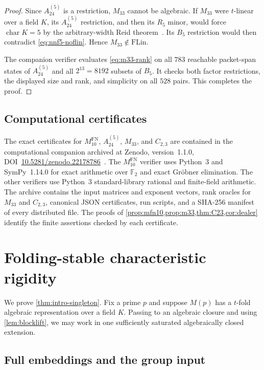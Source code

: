 \documentclass[11pt]{article}
\theoremstyle{definition}
\newcommand{\FLin}{\mathrm{FLin}}
\begin{document}
\begin{proof}
Since $A_{24}^{(5)}$ is a restriction, $M_{33}$ cannot be algebraic.  If $M_{33}$ were $t$-linear over a field $K$, its $A_{24}^{(5)}$ restriction, and then its $R_5$ minor, would force $\operatorname{char}K=5$ by the arbitrary-width Reid theorem~\cite[Theorem~3.1]{BenEfraim2016}.  Its $B_5$ restriction would then contradict \eqref{eq:nnf5-noflin}.  Hence $M_{33}\notin\FLin$.

The companion verifier evaluates \eqref{eq:m33-rank} on all $783$ reachable packet-span states of $A_{24}^{(5)}$ and all $2^{13}=8192$ subsets of $B_5$.  It checks both factor restrictions, the displayed size and rank, and simplicity on all $528$ pairs.  This completes the proof.
\end{proof}

\subsection{Computational certificates}\label{subsec:certificates}

The exact certificates for $M^{\mathrm{FN}}_{10}$, $A_{24}^{(5)}$, $M_{33}$, and $C_{2,3}$ are contained in the computational companion archived at Zenodo, version~1.1.0, DOI~\href{https://doi.org/10.5281/zenodo.22178786}{10.5281/zenodo.22178786}~\cite{KhazaeiCompanion2026}.  The $M^{\mathrm{FN}}_{10}$ verifier uses Python~3 and SymPy~1.14.0 for exact arithmetic over $\mathbb F_2$ and exact Gr\"obner elimination.  The other verifiers use Python~3 standard-library rational and finite-field arithmetic.  The archive contains the input matrices and exponent vectors, rank oracles for $M_{33}$ and $C_{2,3}$, canonical JSON certificates, run scripts, and a SHA-256 manifest of every distributed file.  The proofs of \cref{prop:mfn10,prop:m33,thm:C23,cor:dealer} identify the finite assertions checked by each certificate.

\section{Folding-stable characteristic rigidity}\label{sec:proof}

We prove \cref{thm:intro-singleton}.  Fix a prime $p$ and suppose $M(p)$ has a $t$-fold algebraic representation over a field $K$.  Passing to an algebraic closure and using \cref{lem:blocklift}, we may work in one sufficiently saturated algebraically closed extension.

\subsection{Full embeddings and the group input}
\end{document}
